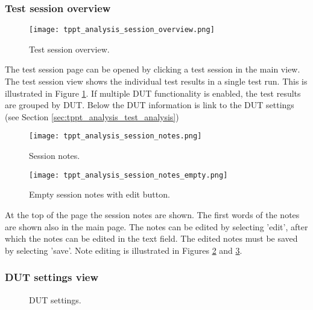 \subsubsection{Test session overview}

\begin{figure}[!h]
	\centering
	\texttt{[image: tppt\_analysis\_session\_overview.png]}
	\caption{Test session overview.}
	\label{fig:tppt_analysis_session_overview}
\end{figure}

The test session page can be opened by clicking a test session in the main view. The test session view shows the individual test results in a single test run. This is illustrated in Figure \ref{fig:tppt_analysis_session_overview}.
If multiple DUT functionality is enabled, the test results are grouped by DUT. Below the DUT information is link to the DUT settings (see Section \ref{sec:tppt_analysis_test_analysis})

\begin{figure}[!h]
	\centering
	\texttt{[image: tppt\_analysis\_session\_notes.png]}
	\caption{Session notes.}
	\label{fig:tppt_analysis_session_notes}
\end{figure}

\begin{figure}[!h]
	\centering
	\texttt{[image: tppt\_analysis\_session\_notes\_empty.png]}
	\caption{Empty session notes with edit button.}
	\label{fig:tppt_analysis_session_notes_empty}
\end{figure}

At the top of the page the session notes are shown. The first words of the notes are shown also in the main page. The notes can be edited by selecting 'edit', after which the notes can be edited in the text field. The edited notes must be saved by selecting 'save'. Note editing is illustrated in Figures \ref{fig:tppt_analysis_session_notes} and \ref{fig:tppt_analysis_session_notes_empty}.

\subsubsection{DUT settings view}

\begin{figure}[!h]
	\centering
	\qquad
	\caption{DUT settings.}
\end{figure}

